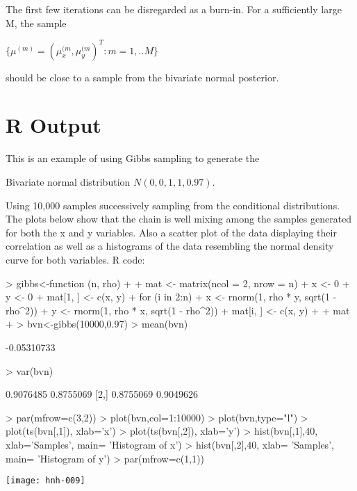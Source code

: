 \documentclass[11pt,a4paper]{article}
\theoremstyle{plain}
\begin{document}
The first few iterations can be disregarded as a burn-in. For a sufficiently large M, the sample 
\begin{center}$\{\mu^{(m)}=(\mu_x^{(m},\mu_y^{(m})^T:m=1,..M \}$ 
\end{center}
should be close to a sample from the bivariate normal posterior.



\newpage
\section*{R Output}
This is an example of using Gibbs sampling to generate the 
\begin{center}Bivariate normal distribution $N(0,0,1,1,0.97)$.
\end{center}
Using 10,000 samples  successively sampling from the conditional distributions. The plots below show that the  chain is well mixing among the samples generated for both the x and y variables. Also a scatter plot of the data displaying their correlation as well as a histograms of the data resembling the normal density curve for both variables. 
\newline R code:
\begin{Schunk}
\begin{Sinput}
> gibbs<-function (n, rho) 
+ {
+   mat <- matrix(ncol = 2, nrow = n)
+   x <- 0
+   y <- 0
+   mat[1, ] <- c(x, y)
+   for (i in 2:n) {
+     x <- rnorm(1, rho * y, sqrt(1 - rho^2))
+     y <- rnorm(1, rho * x, sqrt(1 - rho^2))
+     mat[i, ] <- c(x, y)
+   }
+   mat
+ }
> bvn<-gibbs(10000,0.97)
> mean(bvn)
\end{Sinput}
\begin{Soutput}
[1] -0.05310733
\end{Soutput}
\begin{Sinput}
> var(bvn)
\end{Sinput}
\begin{Soutput}
          [,1]      [,2]
[1,] 0.9076485 0.8755069
[2,] 0.8755069 0.9049626
\end{Soutput}
\begin{Sinput}
> par(mfrow=c(3,2))
> plot(bvn,col=1:10000)
> plot(bvn,type="l")
> plot(ts(bvn[,1]), xlab='x')
> plot(ts(bvn[,2]), xlab='y')
> hist(bvn[,1],40, xlab='Samples', main= 'Histogram of x')
> hist(bvn[,2],40, xlab= 'Samples', main= 'Histogram of y')
> par(mfrow=c(1,1))
\end{Sinput}
\end{Schunk}
\texttt{[image: hnh-009]}
\end{document}
